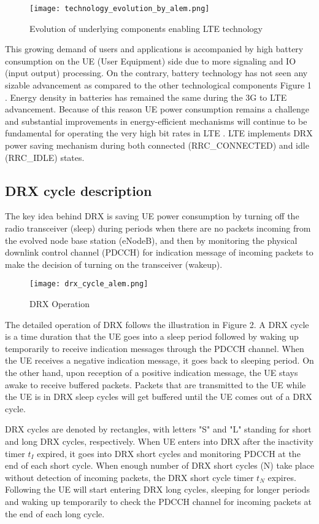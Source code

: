 \documentclass[8pt]{article}
\begin{document}
\begin{figure}[h!]
\texttt{[image: technology\_evolution\_by\_alem.png]}
\caption{Evolution of underlying components enabling LTE technology}
\label{fig:evolution}
\end{figure}

This growing demand of users and applications is accompanied by high battery consumption on the UE (User Equipment) side due to more signaling and IO (input output) processing. On the contrary, battery technology has not seen any sizable advancement as compared to the other technological components Figure 1 \cite{holma2012lte}. Energy density in batteries has remained the same during the 3G to LTE advancement. Because of this reason UE power consumption remains a challenge and substantial improvements in energy-efficient mechanisms will continue to be fundamental for operating the very high bit rates in LTE \cite{6363708}. LTE implements DRX power saving mechanism during both connected (RRC\_CONNECTED) and idle (RRC\_IDLE) states.

\subsection*{DRX cycle description}
The key idea behind DRX is saving UE power consumption by turning off the radio transceiver (sleep) during periods when there are no packets incoming from the evolved node base station (eNodeB), and then by monitoring the physical downlink control channel (PDCCH) for indication message of incoming packets to make the decision of turning on the transceiver (wakeup).   

\begin{figure}[h!]
\texttt{[image: drx\_cycle\_alem.png]}
\caption{DRX Operation} 
\label{fig:DRX}
\end{figure}
The detailed operation of DRX follows the illustration in Figure 2. A DRX cycle is a time duration that the UE goes into a sleep period followed by waking up temporarily to receive indication messages through the PDCCH channel. When the UE receives a negative indication message, it goes back to sleeping period. On the other hand, upon reception of a positive indication message, the UE stays awake to receive buffered packets. Packets that are transmitted to the UE while the UE is in DRX sleep cycles will get buffered until the UE comes out of a DRX cycle.
 
 
DRX cycles are denoted by rectangles, with letters "S" and "L" standing for short and long DRX cycles, respectively. When UE enters into DRX after the inactivity timer \(t_I\) expired, it goes into DRX short cycles and monitoring PDCCH at the end of each short cycle. When enough number of DRX short cycles (N) take place without detection of incoming packets, the DRX short cycle timer \(t_N\) expires. Following the UE will start entering DRX long cycles, sleeping for longer periods and waking up temporarily to check the PDCCH channel for incoming packets at the end of each long cycle. 
\end{document}
